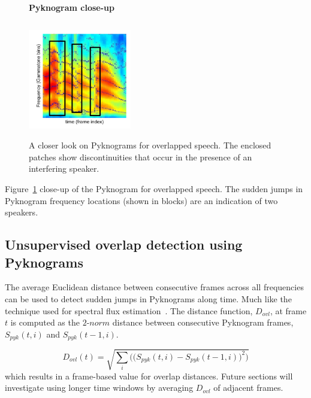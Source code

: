 {\begin{figure}[h!]
	\centering
	\vspace{1mm}
	\textbf{Pyknogram close-up}\par\medskip
	\vspace{-1mm}
	\includegraphics[height =2.0in, width=0.4\textwidth]{figures/co-channel_pyknogram-crop}
	\vspace{-1mm}
	\caption{ A closer look on Pyknograms for overlapped speech. The enclosed patches show discontinuities that occur in the presence of an interfering speaker.}
	\vspace{-1mm}
	\label{fig:ch2_pyknograms_for_overlaps}
\end{figure}

Figure~\ref{fig:ch2_pyknograms_for_overlaps} close-up of the Pyknogram for overlapped speech. 
The sudden jumps in Pyknogram frequency locations (shown in blocks) are an indication of two speakers. 

\newpage
\subsection{Unsupervised overlap detection using Pyknograms}
\label{ssec:unsupervised_ovl_det_pykno}
The average Euclidean distance between consecutive frames across all frequencies can be used to detect sudden jumps in Pyknograms along time. 
Much like the technique used for spectral flux estimation~\cite{Rossignol_spectralflux}. 
The distance function, $D_{ovl}$, at frame $t$ is computed as the $2$-$norm$ distance between consecutive Pyknogram frames, $S_{pyk}(t,i)$ and $S_{pyk}(t-1,i)$. 

\begin{equation}
\label{eq:ovl_det_score}
D_{ovl}(t) = \sqrt{\sum_i\Big(\big(S_{pyk}(t,i)-S_{pyk}(t-1,i)\big)^2\Big)}
\end{equation}
which results in a frame-based value for overlap distances. 
Future sections will investigate using longer time windows by averaging $D_{ovl}$ of adjacent frames. 

}
